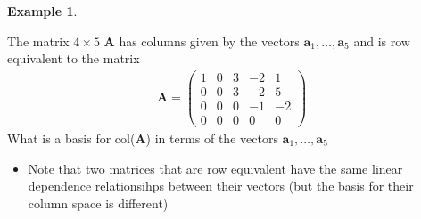 \documentclass[
]{book}
\providecommand{\tightlist}{%
  \setlength{\itemsep}{0pt}\setlength{\parskip}{0pt}}
\theoremstyle{definition}
\theoremstyle{definition}
\newtheorem{example}{Example}[chapter]
\theoremstyle{definition}
\theoremstyle{remark}
\begin{document}
\begin{example}
\protect\hypertarget{exm:unlabeled-div-132}{}\label{exm:unlabeled-div-132}

The matrix \(4 \times 5\) \(\mathbf{A}\) has columns given by the vectors \(\mathbf{a}_1, \ldots, \mathbf{a}_5\) and is row equivalent to the matrix
\[
\begin{aligned}
\mathbf{A} = \begin{pmatrix} 1 & 0 & 3 & -2 & 1 \\ 0 & 0 & 3 & -2 & 5 \\ 0 & 0 & 0 & -1 & -2 \\ 0 & 0 & 0 & 0 & 0 \end{pmatrix}
\end{aligned}
\]
What is a basis for col(\(\mathbf{A}\)) in terms of the vectors \(\mathbf{a}_1, \ldots, \mathbf{a}_5\)

\end{example}

\begin{itemize}
\tightlist
\item
  Note that two matrices that are row equivalent have the same linear dependence relationsihps between their vectors (but the basis for their column space is different)
\end{itemize}
\end{document}
